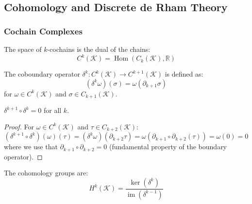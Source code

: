 \subsection{Cohomology and Discrete de Rham Theory}

\subsubsection{Cochain Complexes}

\begin{definition}\label{def:espacio_cocadenas}
The space of $k$-cochains is the dual of the chains:
\begin{equation}
    C^k(\mathcal{K}) = \operatorname{Hom}(C_k(\mathcal{K}), \mathbb{R})
\end{equation}
\end{definition}

\begin{definition}\label{def:operador_coborde}
The coboundary operator $\delta^k: C^k(\mathcal{K}) \to C^{k+1}(\mathcal{K})$ is defined as:
\begin{equation}
    (\delta^k \omega)(\sigma) = \omega(\partial_{k+1} \sigma)
\end{equation}
for $\omega \in C^k(\mathcal{K})$ and $\sigma \in C_{k+1}(\mathcal{K})$.
\end{definition}

\begin{theorem}\label{thm:coborde_coborde_cero}
$\delta^{k+1} \circ \delta^k = 0$ for all $k$.
\end{theorem}

\begin{proof}
For $\omega \in C^k(\mathcal{K})$ and $\tau \in C_{k+2}(\mathcal{K})$:
\[
(\delta^{k+1} \circ \delta^k)(\omega)(\tau) = (\delta^k \omega)(\partial_{k+2}\tau) = \omega(\partial_{k+1} \circ \partial_{k+2}(\tau)) = \omega(0) = 0
\]
where we use that $\partial_{k+1} \circ \partial_{k+2} = 0$ (fundamental property of the boundary operator).
\end{proof}

\begin{definition}\label{def:grupos_cohomologia}
The cohomology groups are:
\begin{equation}
    H^k(\mathcal{K}) = \frac{\ker(\delta^k)}{\operatorname{im}(\delta^{k-1})}
\end{equation}
\end{definition}

